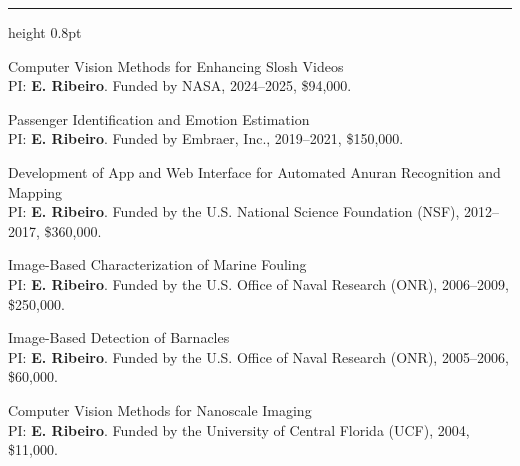 \documentclass[11pt]{article}
\newcommand{\cvsection}[1]{%
  \vspace{12pt}%
  {\normalfont\large\scshape\textls[120]{#1}}\par
  \vspace{2pt}\hrule height 0.8pt\vspace{7pt}}
\begin{document}
\cvsection{Research Grants}
\begin{cvitems}
  \item Computer Vision Methods for Enhancing Slosh Videos\\
  PI: \textbf{E. Ribeiro}. Funded by NASA, 2024--2025, \$94,000.
  \item Passenger Identification and Emotion Estimation\\
  PI: \textbf{E. Ribeiro}. Funded by Embraer, Inc., 2019--2021, \$150,000.
  \item Development of App and Web Interface for Automated Anuran Recognition and Mapping\\
  PI: \textbf{E. Ribeiro}. Funded by the U.S. National Science Foundation (NSF), 2012--2017, \$360,000.
  \item Image-Based Characterization of Marine Fouling\\
  PI: \textbf{E. Ribeiro}. Funded by the U.S. Office of Naval Research (ONR), 2006--2009, \$250,000.
  \item Image-Based Detection of Barnacles\\
  PI: \textbf{E. Ribeiro}. Funded by the U.S. Office of Naval Research (ONR), 2005--2006, \$60,000.
  \item Computer Vision Methods for Nanoscale Imaging\\
  PI: \textbf{E. Ribeiro}. Funded by the University of Central Florida (UCF), 2004, \$11,000.
\end{cvitems}
\end{document}
